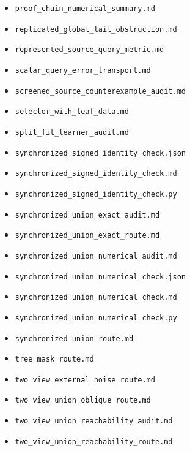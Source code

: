 \documentclass[11pt,oneside,openany,a4paper]{book}
\numberwithin{equation}{chapter}
\theoremstyle{definition}
\theoremstyle{remark}
\newcommand{\sourcefile}[1]{{\small\nolinkurl{#1}}}
\begin{document}
\begin{itemize}[leftmargin=1.2em,itemsep=1pt,topsep=3pt]
\item \sourcefile{proof_chain_numerical_summary.md}
\item \sourcefile{replicated_global_tail_obstruction.md}
\item \sourcefile{represented_source_query_metric.md}
\item \sourcefile{scalar_query_error_transport.md}
\item \sourcefile{screened_source_counterexample_audit.md}
\item \sourcefile{selector_with_leaf_data.md}
\item \sourcefile{split_fit_learner_audit.md}
\item \sourcefile{synchronized_signed_identity_check.json}
\item \sourcefile{synchronized_signed_identity_check.md}
\item \sourcefile{synchronized_signed_identity_check.py}
\item \sourcefile{synchronized_union_exact_audit.md}
\item \sourcefile{synchronized_union_exact_route.md}
\item \sourcefile{synchronized_union_numerical_audit.md}
\item \sourcefile{synchronized_union_numerical_check.json}
\item \sourcefile{synchronized_union_numerical_check.md}
\item \sourcefile{synchronized_union_numerical_check.py}
\item \sourcefile{synchronized_union_route.md}
\item \sourcefile{tree_mask_route.md}
\item \sourcefile{two_view_external_noise_route.md}
\item \sourcefile{two_view_union_oblique_route.md}
\item \sourcefile{two_view_union_reachability_audit.md}
\item \sourcefile{two_view_union_reachability_route.md}
\end{itemize}
\endgroup

\backmatter
\end{document}
